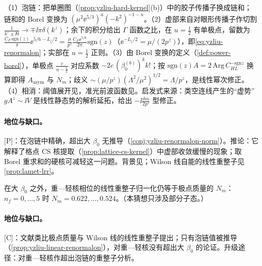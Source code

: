\begin{proofsketch}
（1）泡链：把单圈图（\cref{prop:yzliu-hard-kernel}(b)）中的胶子传播子换成链和；链和的 Borel 变换为 $(\mu^2\ee^{5/3})^u(-k^2)^{-1-u}$\cite[式~(2.44)--(2.45)]{Liu:2023onm}。（2）虚部来自对眼形传播子作切割 $\frac1{k^z\pm\ii0}\to\mp\ii\pi\delta(k^z)$；余下的积分给出 $\Gamma$ 函数之比，在 $u=\frac12$ 有单极点，留数为 $\frac{C_F\,\mathrm{sgn}(z)}{\pi}\ee^{5/6-L_\zeta/2}=\frac{\mu}{p^z}\frac{C_F\ee^{5/6}}{2\pi}\mathrm{sgn}(z)$（$\ee^{-L_\zeta/2}=\mu/(2p^z)$），即\cref{eq:yzliu-renormalon}\cite[式~(2.46)--(2.47)]{Liu:2023onm}；实部在 $u=\frac12$ 正则。（3）由 Borel 变换的定义（\cref{def:power-borel}），单极点 $\frac{c}{u-\frac12}$ 对应系数 $-2c\,(\beta_0^{(b)})^kk!$；按 $\mathrm{sgn}(z)A=2\,\mathrm{Arg}\,C^{-\mathrm{sgn}z}_{HL}$ 换算即得 $A_{\mathrm{asym}}$ 与 $N_m$\cite[式~(2.48)--(2.50)]{Liu:2023onm}；歧义 $\sim(\mu/p^z)(\Lambda^2/\mu^2)^{1/2}=\Lambda/p^z$，是线性幂次修正。（4）相消：阈值展开见\cite[第~3.6~节]{Liu:2023onm}，准光前波函数见\cite[第~4.3--4.4~节、式~(4.28)--(4.33)]{Liu:2023onm}。启发式来源：类空连线产生的“虚势” $gA^z\sim\ii V$ 是线性静态势的解析延拓，给出 $-\ii\frac{\delta m}{2p^z}$ 型修正。
\end{proofsketch}

\paragraph{地位与缺口。}[P]：在泡链中精确，超出大 $\beta_0$ 无推导（\cref{conj:yzliu-renormalon-norm}）。推论：它解释了格点 CS 核提取（\cref{prop:lattice-cs-kernel}）中虚部收敛缓慢的现象；取 Borel 重求和的硬核可减轻这一问题。背景见\cite{Beneke1999,Braun:2018brg}；Wilson 线自能的线性重整子见\cref{prop:lamet-lrr}。

\begin{conjecture}\label{conj:yzliu-renormalon-norm}
在大 $\beta_0$ 之外，重—轻核相位的线性重整子归一化仍等于极点质量的 $N_m$：$n_f=0,\dots,5$ 时 $N_m=0.622,\dots,0.524$\cite[式~(2.52)]{Liu:2023onm}。（本猜想只涉及部分子态。）
\end{conjecture}

\paragraph{地位与缺口。}[C]：文献\cite{Liu:2023onm}类比极点质量与 Wilson 线的线性重整子提出；只有泡链值被推导（\cref{prop:yzliu-linear-renormalon}），对重—轻核没有超出大 $\beta_0$ 的论证。升级途径：对重—轻核作超出泡链的重整子分析。

